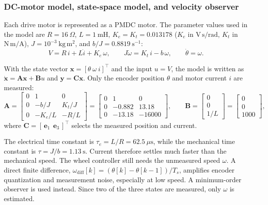 \subsubsection{DC-motor model, state-space model, and velocity observer}
\label{sec:electrical_observer}

Each drive motor is represented as a PMDC motor. The parameter values used in the model are $R=16~\Omega$, $L=1~\mathrm{mH}$, $K_e=K_t=0.013178$ ($K_e$ in $\mathrm{V\,s/rad}$, $K_t$ in $\mathrm{N\,m/A}$), $J=10^{-3}~\mathrm{kg\,m^2}$, and $b/J=0.8819~\mathrm{s}^{-1}$:
\begin{equation}
\label{eq:elec_motor}
V=R\,i+L\dot i+K_e\,\omega,\qquad
J\dot\omega=K_t\,i-b\,\omega,\qquad
\dot\theta=\omega .
\end{equation}

With the state vector $\mathbf{x}=[\theta\ \omega\ i]^\top$ and the input $u=V$, the model is written as $\dot{\mathbf{x}}=\mathbf{A}\mathbf{x}+\mathbf{B}u$ and $\mathbf{y}=\mathbf{C}\mathbf{x}$. Only the encoder position $\theta$ and motor current $i$ are measured:
\begin{equation}
\label{eq:elec_state_space}
\mathbf{A}=
\begin{bmatrix}
0&1&0\\
0&-b/J&K_t/J\\
0&-K_e/L&-R/L
\end{bmatrix}
=
\begin{bmatrix}
0&1&0\\
0&-0.882&13.18\\
0&-13.18&-16000
\end{bmatrix},
\qquad
\mathbf{B}=
\begin{bmatrix}
0\\
0\\
1/L
\end{bmatrix}
=
\begin{bmatrix}
0\\
0\\
1000
\end{bmatrix},
\end{equation}
where $\mathbf{C}=[\,\mathbf{e}_1\ \ \mathbf{e}_3\,]^\top$ selects the measured position and current.

The electrical time constant is $\tau_e=L/R=62.5~\mu\mathrm{s}$, while the mechanical time constant is $\tau=J/b=1.13~\mathrm{s}$. Current therefore settles much faster than the mechanical speed. The wheel controller still needs the unmeasured speed $\omega$. A direct finite difference,
$\omega_{\mathrm{diff}}[k]=(\theta[k]-\theta[k-1])/T_s$, amplifies encoder quantization and measurement noise, especially at low speed. A minimum-order observer is used instead. Since two of the three states are measured, only $\omega$ is estimated.

